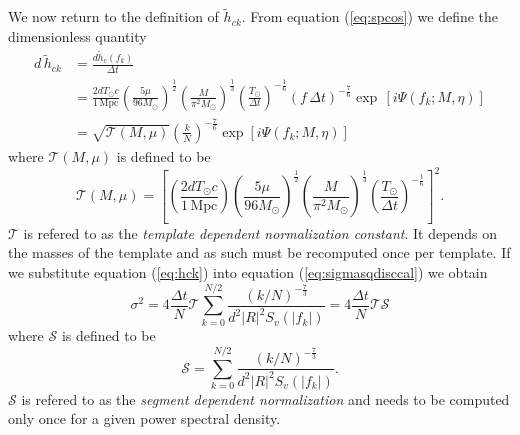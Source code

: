 We now return to the definition of $\tilde{h}_{ck}$.  From equation
(\ref{eq:spcos}) we define the dimensionless quantity
\begin{equation}
\begin{split}
\label{eq:hck}
d\,\tilde{h}_{ck} &= \frac{d \tilde{h}_c(f_k)}{\Delta t} \\
&= 
\frac{2dT_\odot c}{1\,\mathrm{Mpc}}
\left(\frac{5\mu}{96M_\odot}\right)^\frac{1}{2}
\left(\frac{M}{\pi^2M_\odot}\right)^\frac{1}{3}
\left(\frac{T_\odot}{\Delta t}\right)^{-\frac{1}{6}}
\left( f\,\Delta t \right)^{-\frac{7}{6}}
\exp\,[i\Psi(f_k;M,\eta)] \\
&=
\sqrt{\mathcal{T}(M,\mu)}\left(\frac{k}{N}\right)^{-\frac{7}{6}}
\exp\left[i\Psi\left(f_k;M,\eta\right)\right]
\end{split}
\end{equation}
where $\mathcal{T}(M,\mu)$ is defined to be
\begin{equation}
\mathcal{T}(M,\mu) = \left[
\left(\frac{2dT_\odot c}{1\,\mathrm{Mpc}}\right)
\left(\frac{5\mu}{96M_\odot}\right)^\frac{1}{2}
\left(\frac{M}{\pi^2M_\odot}\right)^\frac{1}{3}
\left(\frac{T_\odot}{\Delta t}\right)^{-\frac{1}{6}}
\right]^2.
\end{equation}
$\mathcal{T}$ is refered to as the \emph{template dependent normalization
constant}. It depends on the masses of the template and as such must be
recomputed once per template. If we substitute equation (\ref{eq:hck}) 
into equation (\ref{eq:sigmasqdisccal}) we obtain
\begin{equation}
\sigma^2 = 4 \frac{\Delta t}{N} \mathcal{T} 
\sum_{k=0}^{N/2} 
\frac{\left({k}/{N}\right)^{-\frac{7}{3}}}
{d^2|R|^2S_v\left(\left|f_k\right|\right)}
= 4 \frac{\Delta t}{N} \mathcal{T} \mathcal{S}
\end{equation}
where $\mathcal{S}$ is defined to be
\begin{equation}
\mathcal{S} = 
\sum_{k=0}^{N/2} 
\frac{\left({k}/{N}\right)^{-\frac{7}{3}}}{d^2|R|^2S_v\left(\left|f_k\right|\right)}.
\end{equation}
$\mathcal{S}$ is refered to as the \emph{segment dependent normalization} and
needs to be computed only once for a given power spectral density.

